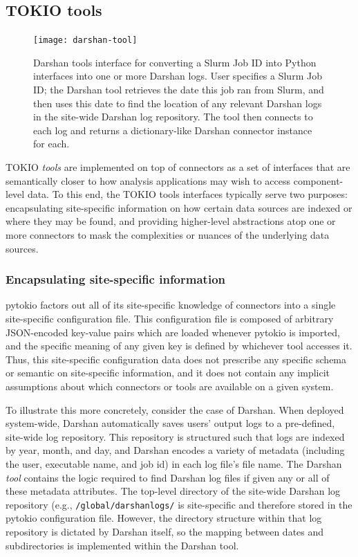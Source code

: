 \subsection{TOKIO tools} \label{sec:architecture/tools}

\begin{figure}
    \centering
    \texttt{[image: darshan-tool]}
    \caption{Darshan tools interface for converting a Slurm Job ID into Python interfaces into one or more Darshan logs.
    User specifies a Slurm Job ID; the Darshan tool retrieves the date this job ran from Slurm, and then uses this date to find the location of any relevant Darshan logs in the site-wide Darshan log repository.
    The tool then connects to each log and returns a dictionary-like Darshan connector instance for each.}
    \label{fig:darshan-tool}
    \vspace{-.2in}
\end{figure}

TOKIO \emph{tools} are implemented on top of connectors as a set of interfaces that are semantically closer to how analysis applications may wish to access component-level data.
To this end, the TOKIO tools interfaces typically serve two purposes:
encapsulating site-specific information on how certain data sources are indexed or where they may be found, and
providing higher-level abstractions atop one or more connectors to mask the complexities or nuances of the underlying data sources.

\subsubsection{Encapsulating site-specific information}

pytokio factors out all of its site-specific knowledge of connectors into a single site-specific configuration file.
This configuration file is composed of arbitrary JSON-encoded key-value pairs which are loaded whenever pytokio is imported, and the specific meaning of any given key is defined by whichever tool accesses it.
Thus, this site-specific configuration data does not prescribe any specific schema or semantic on site-specific information, and it does not contain any implicit assumptions about which connectors or tools are available on a given system.

To illustrate this more concretely, consider the case of Darshan.
When deployed system-wide, Darshan automatically saves users' output logs to a pre-defined, site-wide log repository.
This repository is structured such that logs are indexed by year, month, and day, and Darshan encodes a variety of metadata (including the user, executable name, and job id) in each log file's file name.
The Darshan \emph{tool} contains the logic required to find Darshan log files if given any or all of these metadata attributes.
The top-level directory of the site-wide Darshan log repository (e.g., \texttt{{/global/darshanlogs/}} is site-specific and therefore stored in the pytokio configuration file.
However, the directory structure within that log repository is dictated by Darshan itself, so the mapping between dates and subdirectories is implemented within the Darshan tool.

